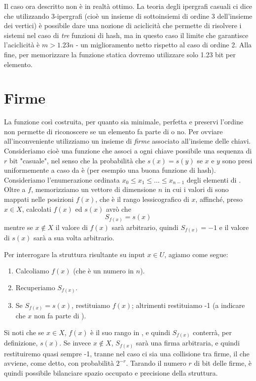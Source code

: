 Il caso ora descritto non è in realtà ottimo. La teoria degli ipergrafi casuali ci dice che utilizzando 3-ipergrafi (cioè un insieme di sottoinsiemi di ordine 3 dell'insieme dei vertici) è possibile dare una nozione di aciclicità che permette di risolvere i sistemi nel caso di \textit{tre} funzioni di hash, ma in questo caso il limite che garantisce l'aciclicità è $m > 1.23n$ - un miglioramento netto rispetto al caso di ordine 2.
Alla fine, per memorizzare la funzione statica  dovremo utilizzare solo 1.23 bit per elemento.
\section{Firme}
La funzione così costruita, per quanto sia minimale, perfetta e preservi l'ordine non permette di riconoscere se un elemento fa parte di  o no. Per ovviare all'inconveniente utilizziamo un insieme di \textit{firme} associato all'insieme  delle chiavi. Consideriamo cioè una funzione  che associ a ogni chiave possibile una sequenza di $r$ bit "casuale", nel senso che la probabilità che $s(x) = s(y)$ se $x$ e $y$ sono presi uniformemente a caso da  è  (per esempio una buona funzione di hash). Consideriamo l'enumerazione ordinata $x_0 \leq x_1 \leq \dots \leq x_{n - 1}$ degli elementi di . Oltre a $f$, memorizziamo
un vettore di dimensione $n$ in cui i valori di  sono mappati nelle posizioni $f(x)$, che è il rango lessicografico di $x$, affinché, preso $x \in X$, calcolati $f(x)$ ed $s(x)$ avrò che
\begin{equation*}
    S_{f(x)} = s(x)
\end{equation*}
mentre se $x \notin X$ il valore di $f(x)$ sarà arbitrario, quindi $S_{f(x)} = -1$ e il valore di $s(x)$ sarà a sua volta arbitrario.

Per interrogare la struttura risultante su input $x \in U$, agiamo come segue:
\begin{enumerate}
    \item Calcoliamo $f(x)$ (che è un numero in $n$).
    \item Recuperiamo $S_{f(x)}$.
    \item Se $S_{f(x)} = s(x)$, restituiamo $f(x)$; altrimenti restituiamo -1 (a indicare che $x$ non fa parte di ).
\end{enumerate}
Si noti che se $x \in X$, $f(x)$ è il suo rango in , e quindi $S_{f(x)}$ conterrà, per definizione, $s(x)$.
Se invece $x \notin X$, $S_{f(x)}$ sarà una firma arbitraria, e quindi restituiremo quasi sempre -1, tranne nel caso ci sia una collisione tra firme, il che avviene, come detto, con probabilità $2^{-r}$. Tarando il numero $r$ di bit delle firme, è quindi possibile bilanciare spazio occupato e precisione della struttura.

